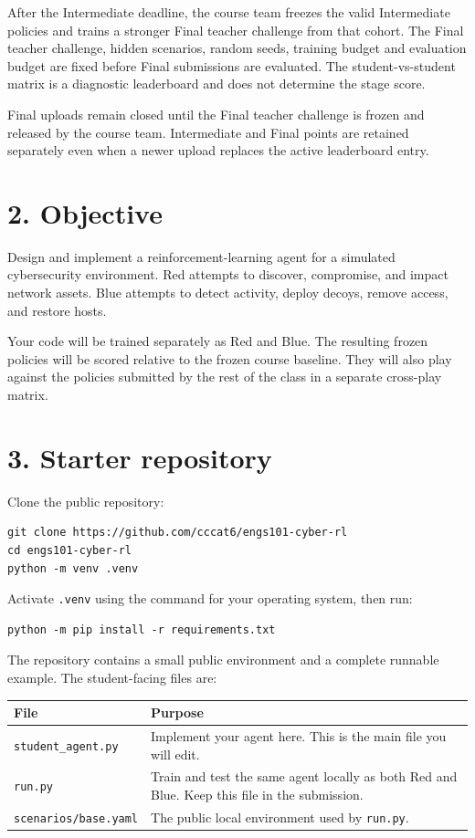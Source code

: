\documentclass[12pt]{report}
\begin{document}
After the Intermediate deadline, the course team freezes the valid Intermediate
policies and trains a stronger Final teacher challenge from that cohort. The
Final teacher challenge, hidden scenarios, random seeds, training budget and
evaluation budget are fixed before Final submissions are evaluated. The
student-vs-student matrix is a diagnostic leaderboard and does not determine
the stage score.

Final uploads remain closed until the Final teacher challenge is frozen and
released by the course team. Intermediate and Final points are retained
separately even when a newer upload replaces the active leaderboard entry.

\section*{2. Objective}

Design and implement a reinforcement-learning agent for a simulated
cybersecurity environment. Red attempts to discover, compromise, and impact
network assets. Blue attempts to detect activity, deploy decoys, remove access,
and restore hosts.

Your code will be trained separately as Red and Blue. The resulting frozen
policies will be scored relative to the frozen course baseline. They will also
play against the policies submitted by the rest of the class in a separate
cross-play matrix.

\section*{3. Starter repository}

Clone the public repository:

\begin{verbatim}
git clone https://github.com/cccat6/engs101-cyber-rl
cd engs101-cyber-rl
python -m venv .venv
\end{verbatim}

Activate \texttt{.venv} using the command for your operating system, then run:

\begin{verbatim}
python -m pip install -r requirements.txt
\end{verbatim}

The repository contains a small public environment and a complete runnable
example. The student-facing files are:

\begin{center}
\begin{tabular}{p{}p{}}
\toprule
\textbf{File} & \textbf{Purpose} \\
\midrule
\texttt{student\_agent.py} &
Implement your agent here. This is the main file you will edit. \\
\texttt{run.py} &
Train and test the same agent locally as both Red and Blue. Keep this file in
the submission. \\
\texttt{scenarios/base.yaml} &
The public local environment used by \texttt{run.py}. \\
\bottomrule
\end{tabular}
\end{center}
\end{document}
